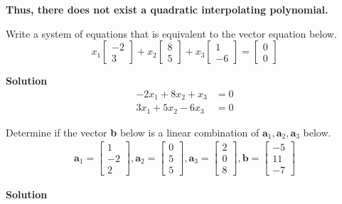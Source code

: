 \documentclass[11pt]{scrartcl}
\theoremstyle{dotlessP}
\theoremstyle{dotlessN}
\begin{document}
\textbf{Thus, there does not exist a quadratic interpolating polynomial.}
\begin{ques}
	Write a system of equations that is equivalent to the vector equation below.
	\[
	x_1 
	\begin{bmatrix}
		-2  \\
		3
	\end{bmatrix} + x_2
	\begin{bmatrix}
		8 \\
		5
	\end{bmatrix} + x_3
	\begin{bmatrix}
		1 \\
		-6
	\end{bmatrix} = 
	\begin{bmatrix}
		0 \\
		0
	\end{bmatrix}
	\] 
\end{ques}
\textbf{Solution}
\begin{align*}
	-2x_1 + 8x_2 + x_3 &= 0 \\
	3x_1 + 5x_2 - 6x_3 &= 0
\end{align*}
\begin{ques}
	Determine if the vector \textbf{b} below is a linear combination of $\textbf{a}_1, \textbf{a}_2, \textbf{a}_3$ below.
	\begin{align*}
		\textbf{a}_1 = 
		\begin{bmatrix}
			1 \\
			-2 \\
			2
		\end{bmatrix}, \textbf{a}_2 = 
		\begin{bmatrix}
			0 \\
			5 \\
			5
		\end{bmatrix}, \textbf{a}_3 = 
		\begin{bmatrix}
			2 \\
			0 \\
			8
		\end{bmatrix}, \textbf{b} = 
		\begin{bmatrix}
			-5 \\
			11 \\
			-7
		\end{bmatrix}
	\end{align*}
\end{ques}
\textbf{Solution}
\end{document}
